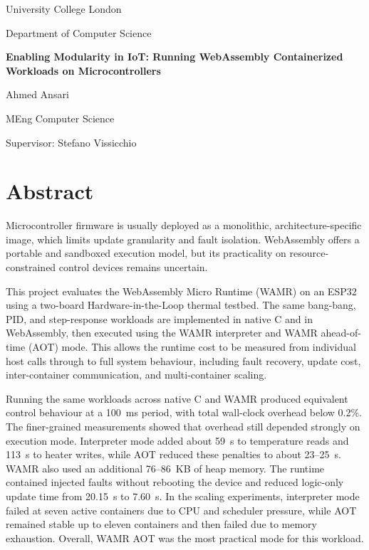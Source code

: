 \documentclass[12pt, a4paper]{report}
\begin{document}

\begin{titlepage}
    \centering
    \vspace*{2cm}
    {\Large University College London \par}
    {\large Department of Computer Science \par}
    \vspace{2cm}
    {\LARGE\bfseries Enabling Modularity in IoT: Running WebAssembly Containerized
Workloads on Microcontrollers \par}
    \vspace{1cm}
    {\large Ahmed Ansari \par}
    \vspace{0.5cm}
    {\large MEng Computer Science \par}
    \vspace{0.5cm}
    {\large Supervisor: Stefano Vissicchio \par}
    \vspace{0.5cm}
\end{titlepage}
 


\chapter*{Abstract}

Microcontroller firmware is usually deployed as a monolithic, architecture-specific image, which limits update granularity and fault isolation. WebAssembly offers a portable and sandboxed execution model, but its practicality on resource-constrained control devices remains uncertain.

This project evaluates the WebAssembly Micro Runtime (WAMR) on an ESP32 using a two-board Hardware-in-the-Loop thermal testbed. The same bang-bang, PID, and step-response workloads are implemented in native C and in WebAssembly, then executed using the WAMR interpreter and WAMR ahead-of-time (AOT) mode. This allows the runtime cost to be measured from individual host calls through to full system behaviour, including fault recovery, update cost, inter-container communication, and multi-container scaling.

Running the same workloads across native C and WAMR produced equivalent control behaviour at a 100~ms period, with total wall-clock overhead below 0.2\%. The finer-grained measurements showed that overhead still depended strongly on execution mode. Interpreter mode added about 59~\textmu{}s to temperature reads and 113~\textmu{}s to heater writes, while AOT reduced these penalties to about 23--25~\textmu{}s. WAMR also used an additional 76--86~KB of heap memory. The runtime contained injected faults without rebooting the device and reduced logic-only update time from 20.15~s to 7.60~s. In the scaling experiments, interpreter mode failed at seven active containers due to CPU and scheduler pressure, while AOT remained stable up to eleven containers and then failed due to memory exhaustion. Overall, WAMR AOT was the most practical mode for this workload.
\end{document}
